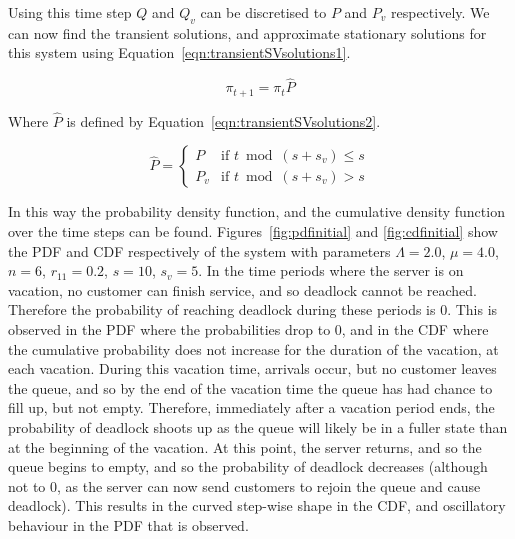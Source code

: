 \documentclass{article}
\begin{document}
Using this time step $Q$ and $Q_v$ can be discretised to $P$ and $P_v$ respectively.
We can now find the transient solutions, and approximate stationary solutions for this system using Equation~\ref{eqn:transientSVsolutions1}.

\begin{equation}\label{eqn:transientSVsolutions1}
\pi_{t+1} = \pi_{t} \hat{P}
\end{equation}

Where $\hat{P}$ is defined by Equation~\ref{eqn:transientSVsolutions2}.

\begin{equation}\label{eqn:transientSVsolutions2}
\hat{P} = \left\{
    \begin{array}{cc}
    P & \text{if } t \bmod (s + s_v) \leq s \\
    P_v & \text{if } t \bmod (s + s_v) > s
    \end{array}\right.
\end{equation}

In this way the probability density function, and the cumulative density function over the time steps can be found.
Figures~\ref{fig:pdfinitial} and \ref{fig:cdfinitial} show the PDF and CDF respectively of the system with parameters $\Lambda = 2.0$, $\mu = 4.0$, $n = 6$, $r_{11} = 0.2$, $s = 10$, $s_v = 5$.
In the time periods where the server is on vacation, no customer can finish service, and so deadlock cannot be reached.
Therefore the probability of reaching deadlock during these periods is $0$.
This is observed in the PDF where the probabilities drop to $0$, and in the CDF where the cumulative probability does not increase for the duration of the vacation, at each vacation.
During this vacation time, arrivals occur, but no customer leaves the queue, and so by the end of the vacation time the queue has had chance to fill up, but not empty.
Therefore, immediately after a vacation period ends, the probability of deadlock shoots up as the queue will likely be in a fuller state than at the beginning of the vacation.
At this point, the server returns, and so the queue begins to empty, and so the probability of deadlock decreases (although not to $0$, as the server can now send customers to rejoin the queue and cause deadlock).
This results in the curved step-wise shape in the CDF, and oscillatory behaviour in the PDF that is observed.
\end{document}
